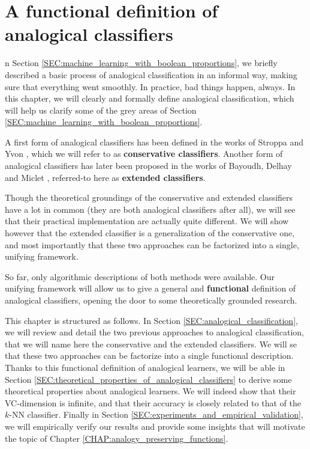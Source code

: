 \chapter{A functional definition of analogical classifiers}
\label{CHAP:functional_definition}

n Section \ref{SEC:machine_learning_with_boolean_proportions}, we
briefly described a basic process of analogical classification in an informal
way, making sure that everything went smoothly. In practice, bad things happen,
always. In this chapter, we will clearly and formally define analogical
classification, which will help us clarify some of the grey areas of Section
\ref{SEC:machine_learning_with_boolean_proportions}.

A first form of analogical classifiers has been defined in the works of Stroppa
and Yvon \cite{StrYvoCNLL05}, which we will refer to as \textbf{conservative
classifiers}. Another form of analogical classifiers has later been proposed in
the works of Bayoudh, Delhay and Miclet \cite{MicBayDelJAIR08,
BayMicDelIJCAI07}, referred-to here as \textbf{extended classifiers}.

Though the theoretical groundings of the conservative and extended
classifiers have a lot in common (they are both analogical classifiers after
all), we will see that their practical implementation are actually quite
different. We will show however that the extended classifier is a
generalization of the conservative one, and most importantly that these two
approaches can be factorized into a single, unifying framework.

So far, only algorithmic descriptions of both methods were available. Our
unifying framework will allow us to give a general and \textbf{functional}
definition of analogical classifiers, opening the door to some theoretically
grounded research.

This chapter is structured as follows. In Section
\ref{SEC:analogical_classification}, we will review and detail the two previous
approaches to analogical classification, that we will name here the
conservative and the extended classifiers. We will se that these two approaches
can be factorize into a single functional description. Thanks to this
functional definition of analogical learners, we will be able in Section
\ref{SEC:theoretical_properties_of_analogical_classifiers} to derive some
theoretical properties about analogical learners. We will indeed show that
their VC-dimension is infinite, and that their accuracy is closely related to
that of the $k$-NN classifier. Finally in Section
\ref{SEC:experiments_and_empirical_validation}, we will empirically verify our
results and provide some insights that will motivate the topic of Chapter
\ref{CHAP:analogy_preserving_functions}.

